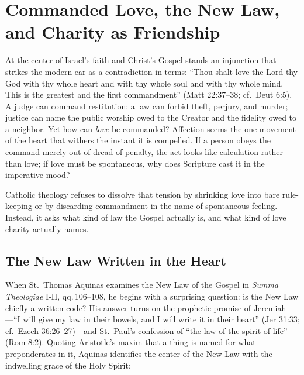 \section{Commanded Love, the New Law, and Charity as Friendship}

At the center of Israel's faith and Christ's Gospel stands an injunction that strikes the modern ear as a contradiction in terms: ``Thou shalt love the Lord thy God with thy whole heart and with thy whole soul and with thy whole mind. This is the greatest and the first commandment'' (Matt 22:37--38; cf.\ Deut 6:5). A judge can command restitution; a law can forbid theft, perjury, and murder; justice can name the public worship owed to the Creator and the fidelity owed to a neighbor. Yet how can \emph{love} be commanded? Affection seems the one movement of the heart that withers the instant it is compelled. If a person obeys the command merely out of dread of penalty, the act looks like calculation rather than love; if love must be spontaneous, why does Scripture cast it in the imperative mood?

Catholic theology refuses to dissolve that tension by shrinking love into bare rule-keeping or by discarding commandment in the name of spontaneous feeling. Instead, it asks what kind of law the Gospel actually is, and what kind of love charity actually names.

\subsection*{The New Law Written in the Heart}

When St.\ Thomas Aquinas examines the New Law of the Gospel in \emph{Summa Theologiae} I-II, qq.\,106--108, he begins with a surprising question: is the New Law chiefly a written code? His answer turns on the prophetic promise of Jeremiah---``I will give my law in their bowels, and I will write it in their heart'' (Jer 31:33; cf.\ Ezech 36:26--27)---and St.\ Paul's confession of ``the law of the spirit of life'' (Rom 8:2). Quoting Aristotle's maxim that a thing is named for what preponderates in it, Aquinas identifies the center of the New Law with the indwelling grace of the Holy Spirit:

